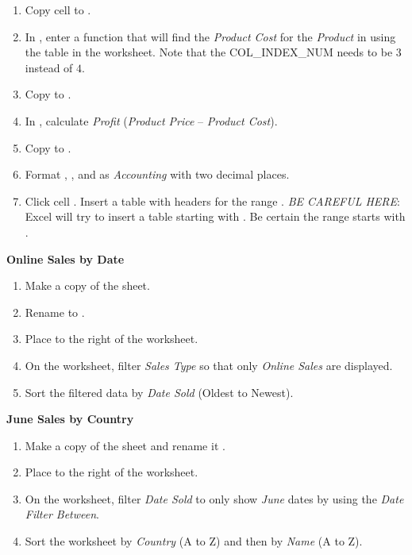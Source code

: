 \begin{enumbox}
\begin{enumerate}
		\item Copy cell  to . 
		\item In , enter a  function that will find the \textit{Product Cost} for the \textit{Product} in  using the table in the  worksheet. Note that the COL\_INDEX\_NUM needs to be $ 3 $ instead of $ 4 $. 
		\item Copy  to .
		\item In , calculate \textit{Profit} (\textit{Product Price} $ – $ \textit{Product Cost}).
		\item Copy  to .
		\item Format , , and  as \textit{Accounting} with two decimal places.
		\item Click cell . Insert a table with headers for the range . \textit{BE CAREFUL HERE}: Excel will try to insert a table starting with . Be certain the range starts with .
	\end{enumerate}
\end{enumbox}
	
\noindent
\textbf{Online Sales by Date}

\begin{enumbox}
	\begin{enumerate}
		\item Make a copy of the  sheet.
		\item Rename  to . \item Place  to the right of the  worksheet. 
		\item On the  worksheet, filter \textit{Sales Type} so that only \textit{Online Sales} are displayed. 
		\item Sort the filtered data by \textit{Date Sold} (Oldest to Newest).
	\end{enumerate}
\end{enumbox}
	
\noindent
\textbf{June Sales by Country}

\begin{enumbox}
	\begin{enumerate}
		\item Make a copy of the  sheet and rename it . 
		\item Place  to the right of the  worksheet. 
		\item On the  worksheet, filter \textit{Date Sold} to only show \textit{June} dates by using the \textit{Date Filter Between}. 
		\item Sort the worksheet by \textit{Country} (A to Z) and then by \textit{Name} (A to Z).
	\end{enumerate}
\end{enumbox}
	
